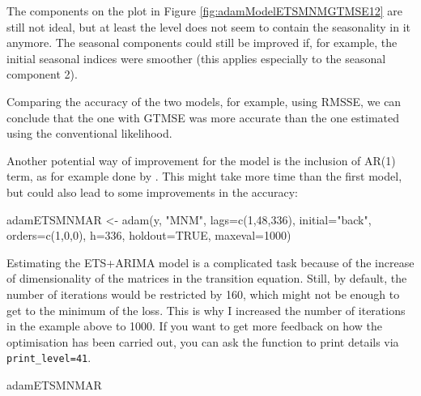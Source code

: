 \documentclass[
]{book}
\newenvironment{Shaded}{\begin{snugshade}}{\end{snugshade}}
\newcommand{\AttributeTok}[1]{\textcolor[rgb]{0.77,0.63,0.00}{#1}}
\newcommand{\ConstantTok}[1]{\textcolor[rgb]{0.00,0.00,0.00}{#1}}
\newcommand{\DecValTok}[1]{\textcolor[rgb]{0.00,0.00,0.81}{#1}}
\newcommand{\FunctionTok}[1]{\textcolor[rgb]{0.00,0.00,0.00}{#1}}
\newcommand{\NormalTok}[1]{#1}
\newcommand{\OtherTok}[1]{\textcolor[rgb]{0.56,0.35,0.01}{#1}}
\newcommand{\StringTok}[1]{\textcolor[rgb]{0.31,0.60,0.02}{#1}}
\theoremstyle{definition}
\theoremstyle{definition}
\theoremstyle{definition}
\theoremstyle{definition}
\theoremstyle{remark}
\begin{document}
The components on the plot in Figure \ref{fig:adamModelETSMNMGTMSE12} are still not ideal, but at least the level does not seem to contain the seasonality in it anymore. The seasonal components could still be improved if, for example, the initial seasonal indices were smoother (this applies especially to the seasonal component 2).

Comparing the accuracy of the two models, for example, using RMSSE, we can conclude that the one with GTMSE was more accurate than the one estimated using the conventional likelihood.

Another potential way of improvement for the model is the inclusion of AR(1) term, as for example done by \citet{Taylor2010}. This might take more time than the first model, but could also lead to some improvements in the accuracy:

\begin{Shaded}
\begin{Highlighting}[]
\NormalTok{adamETSMNMAR }\OtherTok{\textless{}{-}} \FunctionTok{adam}\NormalTok{(y, }\StringTok{"MNM"}\NormalTok{, }\AttributeTok{lags=}\FunctionTok{c}\NormalTok{(}\DecValTok{1}\NormalTok{,}\DecValTok{48}\NormalTok{,}\DecValTok{336}\NormalTok{),}
                     \AttributeTok{initial=}\StringTok{"back"}\NormalTok{, }\AttributeTok{orders=}\FunctionTok{c}\NormalTok{(}\DecValTok{1}\NormalTok{,}\DecValTok{0}\NormalTok{,}\DecValTok{0}\NormalTok{),}
                     \AttributeTok{h=}\DecValTok{336}\NormalTok{, }\AttributeTok{holdout=}\ConstantTok{TRUE}\NormalTok{, }\AttributeTok{maxeval=}\DecValTok{1000}\NormalTok{)}
\end{Highlighting}
\end{Shaded}

Estimating the ETS+ARIMA model is a complicated task because of the increase of dimensionality of the matrices in the transition equation. Still, by default, the number of iterations would be restricted by 160, which might not be enough to get to the minimum of the loss. This is why I increased the number of iterations in the example above to 1000. If you want to get more feedback on how the optimisation has been carried out, you can ask the function to print details via \texttt{print\_level=41}.

\begin{Shaded}
\begin{Highlighting}[]
\NormalTok{adamETSMNMAR}
\end{Highlighting}
\end{Shaded}
\end{document}
